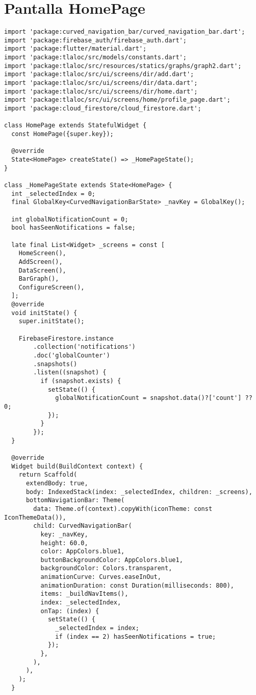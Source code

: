 \section{Pantalla HomePage}
\label{anexo:alg7}
\begin{verbatim}
import 'package:curved_navigation_bar/curved_navigation_bar.dart';
import 'package:firebase_auth/firebase_auth.dart';
import 'package:flutter/material.dart';
import 'package:tlaloc/src/models/constants.dart';
import 'package:tlaloc/src/resources/statics/graphs/graph2.dart';
import 'package:tlaloc/src/ui/screens/dir/add.dart';
import 'package:tlaloc/src/ui/screens/dir/data.dart';
import 'package:tlaloc/src/ui/screens/dir/home.dart';
import 'package:tlaloc/src/ui/screens/home/profile_page.dart';
import 'package:cloud_firestore/cloud_firestore.dart'; 

class HomePage extends StatefulWidget {
  const HomePage({super.key});

  @override
  State<HomePage> createState() => _HomePageState();
}

class _HomePageState extends State<HomePage> {
  int _selectedIndex = 0;
  final GlobalKey<CurvedNavigationBarState> _navKey = GlobalKey();

  int globalNotificationCount = 0;
  bool hasSeenNotifications = false;

  late final List<Widget> _screens = const [
    HomeScreen(),
    AddScreen(),
    DataScreen(),
    BarGraph(),
    ConfigureScreen(),
  ];
  @override
  void initState() {
    super.initState();

    FirebaseFirestore.instance
        .collection('notifications')
        .doc('globalCounter')
        .snapshots()
        .listen((snapshot) {
          if (snapshot.exists) {
            setState(() {
              globalNotificationCount = snapshot.data()?['count'] ?? 0;
            });
          }
        });
  }

  @override
  Widget build(BuildContext context) {
    return Scaffold(
      extendBody: true,
      body: IndexedStack(index: _selectedIndex, children: _screens),
      bottomNavigationBar: Theme(
        data: Theme.of(context).copyWith(iconTheme: const IconThemeData()),
        child: CurvedNavigationBar(
          key: _navKey,
          height: 60.0,
          color: AppColors.blue1,
          buttonBackgroundColor: AppColors.blue1,
          backgroundColor: Colors.transparent,
          animationCurve: Curves.easeInOut,
          animationDuration: const Duration(milliseconds: 800),
          items: _buildNavItems(),
          index: _selectedIndex,
          onTap: (index) {
            setState(() {
              _selectedIndex = index;
              if (index == 2) hasSeenNotifications = true;
            });
          },
        ),
      ),
    );
  }


\end{verbatim}
